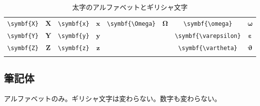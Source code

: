 \begin{longtable}{cccccccc}
    \verb|\symbf{X}| & \(\symbf{X}\) & \verb|\symbf{x}| & \(\symbf{x}\) & \verb|\symbf{\Omega}|   & \(\symbf{\Omega}\)   & \verb|\symbf{\omega}|      & \(\symbf{\omega}\)      \\
    \verb|\symbf{Y}| & \(\symbf{Y}\) & \verb|\symbf{y}| & \(\symbf{y}\) &                         &                      & \verb|\symbf{\varepsilon}| & \(\symbf{\varepsilon}\) \\
    \verb|\symbf{Z}| & \(\symbf{Z}\) & \verb|\symbf{z}| & \(\symbf{z}\) &                         &                      & \verb|\symbf{\vartheta}|   & \(\symbf{\vartheta}\)   \\
    \bottomrule
    \caption{太字のアルファベットとギリシャ文字}
    \label{tab:bold_letters}
\end{longtable}

\subsection{筆記体}

アルファベットのみ。ギリシャ文字は変わらない。数字も変わらない。

